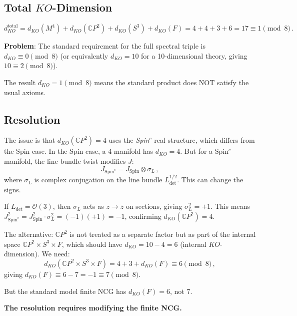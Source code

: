 \documentclass[11pt,a4paper]{article}
\newcommand{\CP}{\mathbb{C}P}
\begin{document}
\subsection{Total $KO$-Dimension}

\begin{equation}
d_{KO}^{\mathrm{total}} = d_{KO}(M^4) + d_{KO}(\CP^2) + d_{KO}(S^3) + d_{KO}(F) = 4 + 4 + 3 + 6 = 17 \equiv 1 \pmod{8}\,.
\end{equation}

\textbf{Problem}: The standard requirement for the full spectral triple is $d_{KO} \equiv 0 \pmod{8}$ (or equivalently $d_{KO} = 10$ for a 10-dimensional theory, giving $10 \equiv 2 \pmod{8}$).

The result $d_{KO} = 1 \pmod{8}$ means the standard product does NOT satisfy the usual axioms.

\subsection{Resolution}

The issue is that $d_{KO}(\CP^2) = 4$ uses the \emph{Spin$^c$} real structure, which differs from the Spin case. In the Spin case, a 4-manifold has $d_{KO} = 4$. But for a Spin$^c$ manifold, the line bundle twist modifies $J$:
\begin{equation}
J_{\mathrm{Spin}^c} = J_{\mathrm{Spin}} \otimes \sigma_{L}\,,
\end{equation}
where $\sigma_L$ is complex conjugation on the line bundle $L_{\det}^{1/2}$. This can change the signs.

If $L_{\det} = \mathcal{O}(3)$, then $\sigma_L$ acts as $z \to \bar{z}$ on sections, giving $\sigma_L^2 = +1$. This means $J_{\mathrm{Spin}^c}^2 = J_{\mathrm{Spin}}^2 \cdot \sigma_L^2 = (-1)(+1) = -1$, confirming $d_{KO}(\CP^2) = 4$.

The alternative: $\CP^2$ is not treated as a separate factor but as part of the internal space $\CP^2 \times S^3 \times F$, which should have $d_{KO} = 10 - 4 = 6$ (internal $KO$-dimension). We need:
\begin{equation}
d_{KO}(\CP^2 \times S^3 \times F) = 4 + 3 + d_{KO}(F) \equiv 6 \pmod{8}\,,
\end{equation}
giving $d_{KO}(F) \equiv 6 - 7 = -1 \equiv 7 \pmod{8}$.

But the standard model finite NCG has $d_{KO}(F) = 6$, not 7.

\textbf{The resolution requires modifying the finite NCG.}
\end{document}
